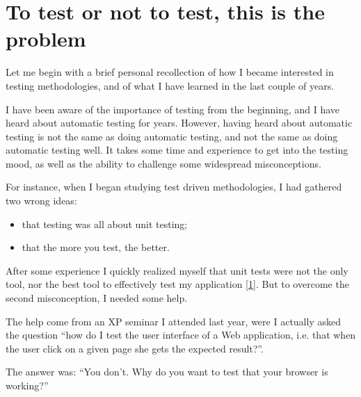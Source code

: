\documentclass[10pt,a4paper,english]{article}
\begin{document}

\hypertarget{to-test-or-not-to-test-this-is-the-problem}{}
\section*{To test or not to test, this is the problem}

Let me begin with a brief personal recollection of how I became 
interested in testing methodologies, and of what I have learned in
the last couple of years.

I have been aware of the importance of testing from the beginning, and
I have heard about automatic testing for years. However, having 
heard about automatic testing is not the same as doing automatic testing, 
and not the same as doing automatic testing well.
It takes some time and experience to get into the testing mood, as well
as the ability to challenge some widespread misconceptions.

For instance, when I began studying test driven methodologies, 
I had gathered two wrong ideas:
\begin{itemize}
\item {} 
that testing was all about unit testing;

\item {} 
that the more you test, the better.

\end{itemize}

After some experience I quickly realized myself that unit tests were
not the only tool, nor the best tool to effectively test my application [\hyperlink{id11}{1}].
But to overcome the second misconception, I needed some help.

The help come from an XP seminar I attended last year, were I
actually asked the question ``how do I test the user interface of
a Web application, i.e. that when the user click on a given page she gets 
the expected result?''.

The answer was: ``You don't. Why do you want to test that your browser is 
working?''



\hypertarget{the-case-for-not-testing-everything}{}
\end{document}
